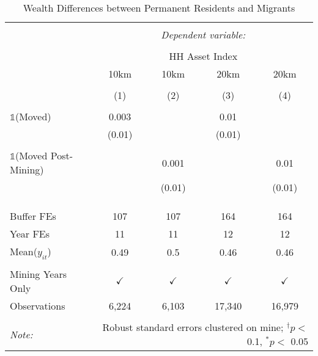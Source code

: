 
\begin{table}[ht!] \centering 
  \caption{Wealth Differences between Permanent Residents and Migrants} 
  \label{tab:did_dhs_migration_wealth} 
\begin{tabular}{@{\extracolsep{0pt}}lcccc} 
\\[-1.8ex]\hline 
\hline \\[-1.8ex] 
 & \multicolumn{4}{c}{\textit{Dependent variable:}} \\ 
\cline{2-5} 
\\[-1.8ex] & \multicolumn{4}{c}{HH Asset Index} \\ 
 & 10km & 10km & 20km & 20km \\ 
\\[-1.8ex] & (1) & (2) & (3) & (4)\\ 
\hline \\[-1.8ex] 
 $\mathbb{1}$(Moved) & 0.003 &  & 0.01 &  \\ 
  & (0.01) &  & (0.01) &  \\ 
  & & & & \\ 
 $\mathbb{1}$(Moved Post-Mining) &  & 0.001 &  & 0.01 \\ 
  &  & (0.01) &  & (0.01) \\ 
  & & & & \\ 
\hline \\[-1.8ex] 
\hline \\[-1.8ex] Buffer FEs & 107 & 107 & 164 & 164 \\ 
Year FEs & 11 & 11 & 12 & 12 \\ 
Mean($y_{it}$) & 0.49 & 0.5 & 0.46 & 0.46 \\ 
\hline \\[-1.8ex] Mining Years Only & $\checkmark$ & $\checkmark$ & $\checkmark$ & $\checkmark$ \\ 
Observations & 6,224 & 6,103 & 17,340 & 16,979 \\ 
\hline 
\hline \\[-1.8ex] 
\textit{Note:}  & \multicolumn{4}{r}{Robust standard errors clustered on mine; $^{\dagger} p <$ 0.1, $^*p <$ 0.05} \\ 
\end{tabular} 
\end{table} 
